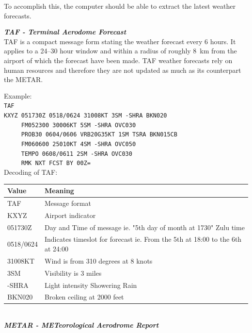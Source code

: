 To accomplish this, the computer should be able to extract the latest weather forecasts.

\emph{\textbf{TAF - Terminal Aerodome Forecast}}\\
TAF is a compact message form stating the weather forecast every 6 hours. It applies to a 24--30 hour window and within a radius of roughly \SI{8}{\kilo\meter} from the airport of which the forecast have been made. 
TAF weather forecasts rely on human resources and therefore they are not updated as much as its counterpart the METAR. 

Example:\\
\verb|TAF|\\
\verb|KXYZ 051730Z 0518/0624 31008KT 3SM -SHRA BKN020|\\
\verb|     FM052300 30006KT 5SM -SHRA OVC030|\\
\verb|     PROB30 0604/0606 VRB20G35KT 1SM TSRA BKN015CB|\\
\verb|     FM060600 25010KT 4SM -SHRA OVC050|\\
\verb|     TEMPO 0608/0611 2SM -SHRA OVC030|\\
\verb|     RMK NXT FCST BY 00Z=|\\

Decoding of TAF:

\begin{tabular}{ll}
	\toprule
	\textbf{Value} & \textbf{Meaning}                    \\\midrule
	TAF            & Message format                      \\
	KXYZ           & Airport indicator                   \\
	051730Z        & Day and Time of message ie. "5th day of month at 1730" Zulu time \\
	
	0518/0624      & Indicates timeslot for forecast ie. From the 5th at 18:00 to the 6th at 24:00 \\
	31008KT        & Wind is from 310 degrees at 8 knots \\
	3SM            & Visibility is 3 miles               \\
	-SHRA          & Light intensity Showering Rain      \\
	BKN020         & Broken ceiling at 2000 feet         \\\bottomrule
\end{tabular}
~\\
\emph{\textbf{ METAR - METeorological Aerodrome Report}}

